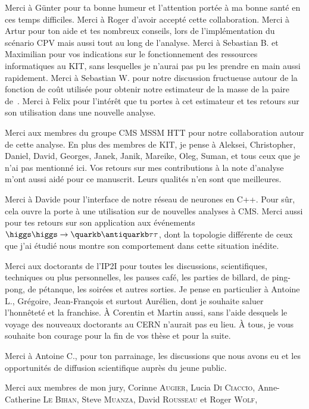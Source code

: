 Merci à Günter pour ta bonne humeur et l'attention portée à ma bonne santé en ces temps difficiles.
Merci à Roger d'avoir accepté cette collaboration.
Merci à Artur pour ton aide et tes nombreux conseils, lors de l'implémentation du scénario CPV mais aussi tout au long de l'analyse.
Merci à Sebastian B. et Maximilian pour vos indications sur le fonctionnement des ressources informatiques au KIT,
sans lesquelles je n'aurai pas pu les prendre en main aussi rapidement.
Merci à Sebastian W. pour notre discussion fructueuse autour de la fonction de coût utilisée pour obtenir notre estimateur de la masse de la paire de~\tau.
Merci à Felix pour l'intérêt que tu portes à cet estimateur et tes retours sur son utilisation dans une nouvelle analyse.
\par
Merci aux membres du groupe CMS MSSM HTT pour notre collaboration autour de cette analyse.
En plus des membres de KIT,
je pense à
Aleksei,
Christopher,
Daniel,
David,
Georges,
Janek,
Janik,
Mareike,
Oleg,
Suman,
et tous ceux que je n'ai pas mentionné ici.
Vos retours sur mes contributions à la note d'analyse m'ont aussi aidé pour ce manuscrit.
Leurs qualités n'en sont que meilleures.
\par
Merci à Davide pour l'interface de notre réseau de neurones en C++.
Pour sûr, cela ouvre la porte à une utilisation sur de nouvelles analyses à CMS.
Merci aussi pour tes retours sur son application aux événements $\higgs\higgs\to\quarkb\antiquarkb\tau\tau$,
dont la topologie différente de ceux que j'ai étudié nous montre son comportement dans cette situation inédite.
\par
Merci aux doctorants de l'IP2I pour
toutes les discussions, scientifiques, techniques ou plus personnelles,
les pauses café,
les parties de billard, de ping-pong, de pétanque,
les soirées et autres sorties.
Je pense en particulier à
Antoine L., Grégoire, Jean-François
et surtout Aurélien,
dont je souhaite saluer l'honnêteté et la franchise.
À Corentin et Martin aussi,
sans l'aide desquels le voyage des nouveaux doctorants au CERN n'aurait pas eu lieu.
À tous, je vous souhaite bon courage pour la fin de vos thèse et pour la suite.
\par
Merci à Antoine C., pour ton parrainage, les discussions que nous avons eu
et les opportunités de diffusion scientifique auprès du jeune public.
\par
Merci aux membres de mon jury,
Corinne \textsc{Augier},
Lucia \textsc{Di Ciaccio},
Anne-Catherine \textsc{Le Bihan},
Steve \textsc{Muanza},
David \textsc{Rousseau} et
Roger \textsc{Wolf},

